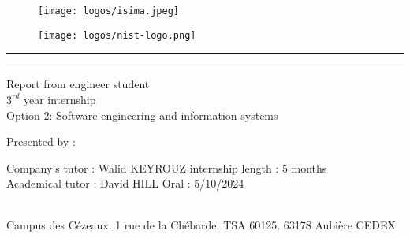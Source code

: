 
\begin{titlepage}
  \rmfamily{}

  \hspace{\fill}
  \begin{figure}[!htb]
     \begin{minipage}{0.50\textwidth}
       \centering
       \texttt{[image: logos/isima.jpeg]}
     \end{minipage}\hfill
     \begin{minipage}{0.50\textwidth}
       \centering
       \texttt{[image: logos/nist-logo.png]}%
     \end{minipage}
     \label{titelfig:logos}
  \end{figure}
  \vspace*{1cm}

  \begin{center}
    \begin{Large}
    \par\noindent\rule{\textwidth}{0.5pt}
    \Huge
    \textbf{\paperTitle}
    \par\noindent\rule{\textwidth}{0.5pt}
    \vspace{0.2cm}
    \LARGE
    Report from engineer student\\
    $3^{rd}$ year internship\\
    Option 2: Software engineering and information systems
    \end{Large}

    \vspace{1.5cm}
    \begin{large}
      Presented by : \textbf{\authorName}\\
    \end{large}
  \end{center}

  \vspace{4cm}
  Company's tutor : Walid KEYROUZ \hfill internship length : 5 months\\
  Academical tutor : David HILL \hfill Oral : 5/10/2024\\~\\

  \begin{center}
    \begin{small}
      Campus des Cézeaux. 1 rue de la Chébarde. TSA 60125. 63178 Aubière CEDEX\par
    \end{small}
  \end{center}
\end{titlepage}
